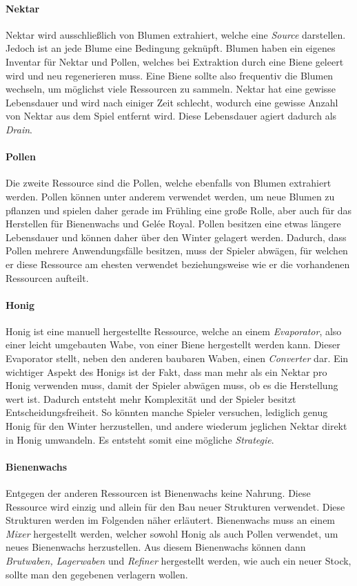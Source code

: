 \paragraph{Nektar}
Nektar wird ausschließlich von Blumen extrahiert, welche eine \textit{Source} darstellen. Jedoch ist an jede Blume eine Bedingung geknüpft. Blumen haben ein eigenes Inventar für Nektar und Pollen, welches bei Extraktion durch eine Biene geleert wird und neu regenerieren muss. Eine Biene sollte also frequentiv die Blumen wechseln, um möglichst viele Ressourcen zu sammeln. Nektar hat eine gewisse Lebensdauer und wird nach einiger Zeit schlecht, wodurch eine gewisse Anzahl von Nektar aus dem Spiel entfernt wird. Diese Lebensdauer agiert dadurch als \textit{Drain}.

\paragraph{Pollen}
Die zweite Ressource sind die Pollen, welche ebenfalls von Blumen extrahiert werden. Pollen können unter anderem verwendet werden, um neue Blumen zu pflanzen und spielen daher gerade im Frühling eine große Rolle, aber auch für das Herstellen für Bienenwachs und Gelée Royal. Pollen besitzen eine etwas längere Lebensdauer und können daher über den Winter gelagert werden. Dadurch, dass Pollen mehrere Anwendungsfälle besitzen, muss der Spieler abwägen, für welchen er diese Ressource am ehesten verwendet beziehungsweise wie er die vorhandenen Ressourcen aufteilt.

\paragraph{Honig}
Honig ist eine manuell hergestellte Ressource, welche an einem \textit{Evaporator}, also einer leicht umgebauten Wabe, von einer Biene hergestellt werden kann. Dieser Evaporator stellt, neben den anderen baubaren Waben, einen \textit{Converter} dar. Ein wichtiger Aspekt des Honigs ist der Fakt, dass man mehr als ein Nektar pro Honig verwenden muss, damit der Spieler abwägen muss, ob es die Herstellung wert ist. Dadurch entsteht mehr Komplexität und der Spieler besitzt Entscheidungsfreiheit. So könnten manche Spieler versuchen, lediglich genug Honig für den Winter herzustellen, und andere wiederum jeglichen Nektar direkt in Honig umwandeln. Es entsteht somit eine mögliche \textit{Strategie}.

\paragraph{Bienenwachs}
Entgegen der anderen Ressourcen ist Bienenwachs keine Nahrung. Diese Ressource wird einzig und allein für den Bau neuer Strukturen verwendet. Diese Strukturen werden im Folgenden näher erläutert. Bienenwachs muss an einem \textit{Mixer} hergestellt werden, welcher sowohl Honig als auch Pollen verwendet, um neues Bienenwachs herzustellen. Aus diesem Bienenwachs können dann \textit{Brutwaben, Lagerwaben} und \textit{Refiner} hergestellt werden, wie auch ein neuer Stock, sollte man den gegebenen verlagern wollen.

